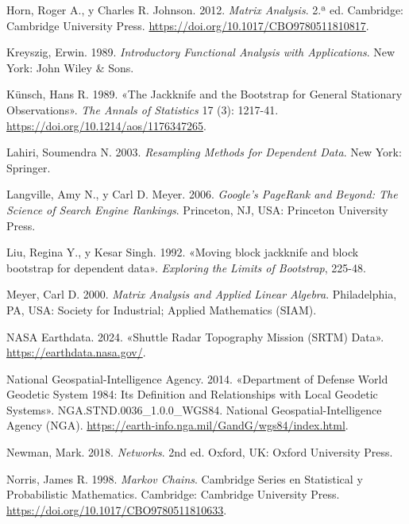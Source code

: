 \documentclass[
  spanish,
  us-letterpaper,
]{scrreprt}
\newlength{\cslhangindent}
\newenvironment{CSLReferences}[2] %
 {\begin{list}{}{%
  \setlength{\itemindent}{0pt}
  \setlength{\leftmargin}{0pt}
  \setlength{\parsep}{0pt}
  \ifodd #1
   \setlength{\leftmargin}{\cslhangindent}
   \setlength{\itemindent}{-1\cslhangindent}
  \fi
  \setlength{\itemsep}{#2\baselineskip}}}
 {\end{list}}
\numberwithin{equation}{section}
\begin{document}
\begin{CSLReferences}{1}{0}
Horn, Roger A., y Charles R. Johnson. 2012. \emph{Matrix Analysis}. 2.ª
ed. Cambridge: Cambridge University Press.
\url{https://doi.org/10.1017/CBO9780511810817}.

Kreyszig, Erwin. 1989. \emph{Introductory Functional Analysis with
Applications}. New York: John Wiley \& Sons.

Künsch, Hans R. 1989. {«The Jackknife and the Bootstrap for General
Stationary Observations»}. \emph{The Annals of Statistics} 17 (3):
1217-41. \url{https://doi.org/10.1214/aos/1176347265}.

Lahiri, Soumendra N. 2003. \emph{Resampling Methods for Dependent Data}.
New York: Springer.

Langville, Amy N., y Carl D. Meyer. 2006. \emph{Google's PageRank and
Beyond: The Science of Search Engine Rankings}. Princeton, NJ, USA:
Princeton University Press.

Liu, Regina Y., y Kesar Singh. 1992. {«Moving block jackknife and block
bootstrap for dependent data»}. \emph{Exploring the Limits of
Bootstrap}, 225-48.

Meyer, Carl D. 2000. \emph{Matrix Analysis and Applied Linear Algebra}.
Philadelphia, PA, USA: Society for Industrial; Applied Mathematics
(SIAM).

NASA Earthdata. 2024. {«Shuttle Radar Topography Mission (SRTM) Data»}.
\url{https://earthdata.nasa.gov/}.

National Geospatial-Intelligence Agency. 2014. {«Department of Defense
World Geodetic System 1984: Its Definition and Relationships with Local
Geodetic Systems»}. NGA.STND.0036\_1.0.0\_WGS84. National
Geospatial-Intelligence Agency (NGA).
\url{https://earth-info.nga.mil/GandG/wgs84/index.html}.

Newman, Mark. 2018. \emph{Networks}. 2nd ed. Oxford, UK: Oxford
University Press.

Norris, James R. 1998. \emph{Markov Chains}. Cambridge Series en
Statistical y Probabilistic Mathematics. Cambridge: Cambridge University
Press. \url{https://doi.org/10.1017/CBO9780511810633}.


\end{CSLReferences}
\end{document}
